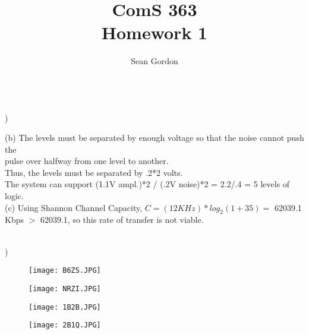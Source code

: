 \documentclass[12pt]{article}
\title{ComS 363\\Homework 1}
\author{Sean Gordon}
\begin{document}
\maketitle


\hrulefill \\


)\\
\indent \indent 

(b) The levels must be separated by enough voltage so that the noise cannot push the \\
\indent \indent pulse over halfway from one level to another.\\
\indent \indent Thus, the levels must be separated by .2*2 volts.\\

\indent \indent The system can support (1.1V ampl.)*2 / (.2V noise)*2 = 2.2/.4 = 5 levels of logic.\\

\indent (c) Using Shannon Channel Capacity, $C = (12 KHz)*log_2(1+35) = $ 62039.1\\
\indent {} Kbps $>$ 62039.1, so this rate of transfer is not viable.

\hrulefill \\


)\\
\begin{figure}[h!]
  \centering
  \texttt{[image: B6ZS.JPG]}
\end{figure}
\begin{figure}[h!]
  \centering
  \texttt{[image: NRZI.JPG]}
\end{figure}
\begin{figure}[h!]
  \centering
  \texttt{[image: 1B2B.JPG]}
\end{figure}
\begin{figure}[h!]
  \centering
  \texttt{[image: 2B1Q.JPG]}
\end{figure}
\end{document}
